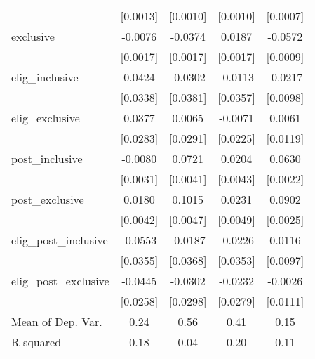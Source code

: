 \begin{table}[htbp]
\begin{tabular}{l*{4}{c}}
                    &    [0.0013]         &    [0.0010]         &    [0.0010]         &    [0.0007]         \\
\addlinespace
exclusive           &     -0.0076\sym{***}&     -0.0374\sym{***}&      0.0187\sym{***}&     -0.0572\sym{***}\\
                    &    [0.0017]         &    [0.0017]         &    [0.0017]         &    [0.0009]         \\
\addlinespace
elig\_inclusive      &      0.0424         &     -0.0302         &     -0.0113         &     -0.0217\sym{**} \\
                    &    [0.0338]         &    [0.0381]         &    [0.0357]         &    [0.0098]         \\
\addlinespace
elig\_exclusive      &      0.0377         &      0.0065         &     -0.0071         &      0.0061         \\
                    &    [0.0283]         &    [0.0291]         &    [0.0225]         &    [0.0119]         \\
\addlinespace
post\_inclusive      &     -0.0080\sym{**} &      0.0721\sym{***}&      0.0204\sym{***}&      0.0630\sym{***}\\
                    &    [0.0031]         &    [0.0041]         &    [0.0043]         &    [0.0022]         \\
\addlinespace
post\_exclusive      &      0.0180\sym{***}&      0.1015\sym{***}&      0.0231\sym{***}&      0.0902\sym{***}\\
                    &    [0.0042]         &    [0.0047]         &    [0.0049]         &    [0.0025]         \\
\addlinespace
elig\_post\_inclusive &     -0.0553         &     -0.0187         &     -0.0226         &      0.0116         \\
                    &    [0.0355]         &    [0.0368]         &    [0.0353]         &    [0.0097]         \\
\addlinespace
elig\_post\_exclusive &     -0.0445\sym{*}  &     -0.0302         &     -0.0232         &     -0.0026         \\
                    &    [0.0258]         &    [0.0298]         &    [0.0279]         &    [0.0111]         \\
\midrule
Mean of Dep. Var.   &        0.24         &        0.56         &        0.41         &        0.15         \\
R-squared           &        0.18         &        0.04         &        0.20         &        0.11         \\

\end{tabular}
\end{table}
